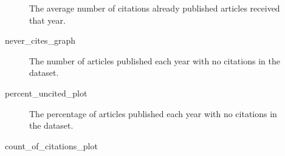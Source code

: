 \documentclass[
  10pt,
  letterpaper,
  DIV=11,
  numbers=noendperiod,
  twoside]{scrartcl}
\newenvironment{Shaded}{\begin{snugshade}}{\end{snugshade}}
\newcommand{\NormalTok}[1]{\textcolor[rgb]{0.00,0.23,0.31}{#1}}
\begin{document}
\begin{figure}[H]


\caption{\label{fig-citationrateperyear}The average number of citations
already published articles received that year.}

\end{figure}%

\begin{Shaded}
\begin{Highlighting}[]
\NormalTok{never\_cites\_graph}
\end{Highlighting}
\end{Shaded}

\begin{figure}[H]


\caption{\label{fig-nevercites}The number of articles published each
year with no citations in the dataset.}

\end{figure}%

\begin{Shaded}
\begin{Highlighting}[]
\NormalTok{percent\_uncited\_plot}
\end{Highlighting}
\end{Shaded}

\begin{figure}[H]


\caption{\label{fig-percentuncited}The percentage of articles published
each year with no citations in the dataset.}

\end{figure}%

\begin{Shaded}
\begin{Highlighting}[]
\NormalTok{count\_of\_citations\_plot}
\end{Highlighting}
\end{Shaded}

\begin{figure}[H]


\caption{\label{fig-countofcitations}}

\end{figure}%
\end{document}
